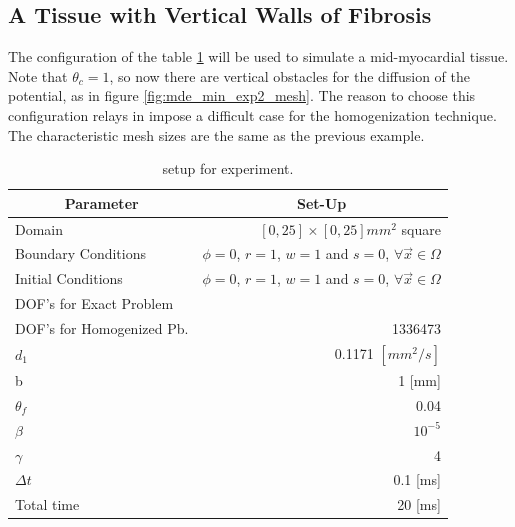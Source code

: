 \newpage
\subsection{A Tissue with Vertical Walls of Fibrosis}

The configuration of the table \ref{tab:mde_min_setup_3} will be used to simulate a mid-myocardial tissue. Note that $\theta_c = 1$, so now there are vertical obstacles for the diffusion of the potential, as in figure \ref{fig:mde_min_exp2_mesh}. The reason to choose this configuration relays in impose a difficult case for the homogenization technique. The characteristic mesh sizes are the same as the previous example.

\begin{table}[H]
\centering
\begin{tabular}{@{}lr@{}}
\toprule
\multicolumn{1}{c}{Parameter} & \multicolumn{1}{c}{Set-Up}                                            \\ \midrule
Domain                        & $[0, 25] \times [0, 25] mm^2$ square                                    \\
Boundary Conditions           & $\phi = 0$, $r = 1$, $w = 1$ and $s = 0$, $\forall \vec{x} \in \Omega$ \\
Initial Conditions            & $\phi = 0$, $r = 1$, $w = 1$ and $s = 0$, $\forall \vec{x} \in \Omega$             \\
DOF's for Exact Problem       &    															 \\
DOF's for Homogenized Pb.     & 1336473                                                                   \\
$d_1$						 & 0.1171 $[mm^2/s]$  												 \\
b & 1 [mm] \\
$\theta_f$                    & 0.04                                                                   \\
$\beta$                       & $10^{-5}$                                                             \\
$\gamma$                      & 4                                                                     \\
$\Delta t $                  & 0.1 [ms]                                                                \\
Total time &	 20 [ms] \\ \bottomrule
\end{tabular}
\caption{setup for experiment.} \label{tab:mde_min_setup_3}
\end{table}

